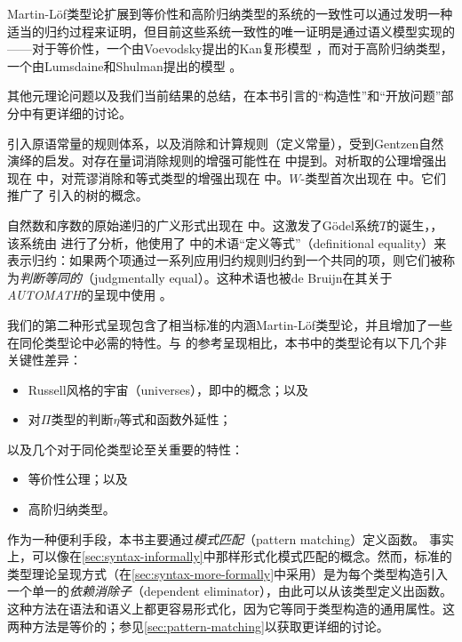 Martin-Löf类型论扩展到等价性和高阶归纳类型的系统的一致性可以通过发明一种适当的归约过程来证明，但目前这些系统一致性的唯一证明是通过语义模型实现的——对于等价性，一个由Voevodsky提出的Kan复形模型 \cite{klv:ssetmodel}，而对于高阶归纳类型，一个由Lumsdaine和Shulman提出的模型 \cite{ls:hits}。

其他元理论问题以及我们当前结果的总结，在本书引言的“构造性”和“开放问题”部分中有更详细的讨论。

%
\sectionNotes\label{subsec:general-remarks}


引入原语常量的规则体系，以及消除和计算规则（定义常量），受到Gentzen自然演绎的启发。对存在量词消除规则的增强可能性在 \cite{howard:pat} 中提到。对析取的公理增强出现在 \cite{Martin-Lof-1972} 中，对荒谬消除和等式类型的增强出现在 \cite{Martin-Lof-1973} 中。$W$-类型首次出现在 \cite{Martin-Lof-1979} 中。它们推广了 \cite{Tait-1968} 引入的树的概念。
%


自然数和序数的原始递归的广义形式出现在 \cite{Hilbert-1925} 中。这激发了G\"odel系统$T$的诞生，\cite{Goedel-T-1958}，该系统由 \cite{Tait-1966} 进行了分析，他使用了 \cite{Goedel-T-1958} 中的术语“定义等式”（definitional equality）来表示归约：如果两个项通过一系列应用归约规则归约到一个共同的项，则它们被称为\emph{判断等同的}（judgmentally equal）。这种术语也被de Bruijn在其关于\emph{AUTOMATH}的呈现中使用 \cite{deBruijn-1973}。
%

我们的第二种形式呈现包含了相当标准的内涵Martin-Löf类型论，并且增加了一些在同伦类型论中必需的特性。与 \cite{hofmann:syntax-and-semantics} 的参考呈现相比，本书中的类型论有以下几个非关键性差异：
%
\begin{itemize}
\item Russell风格的宇宙（universes），即\cite{martin-lof:bibliopolis}中的概念；以及
\item 对$\Pi$类型的判断$\eta$等式和函数外延性；
\end{itemize}
以及几个对于同伦类型论至关重要的特性：
\begin{itemize}
\item 等价性公理；以及
\item 高阶归纳类型。
\end{itemize}
%
作为一种便利手段，本书主要通过\emph{模式匹配}（pattern matching）定义函数。
%
%
事实上，可以像在\cref{sec:syntax-informally}中那样形式化模式匹配的概念。然而，标准的类型理论呈现方式（在\cref{sec:syntax-more-formally}中采用）是为每个类型构造引入一个单一的\emph{依赖消除子}（dependent eliminator），由此可以从该类型定义出函数。这种方法在语法和语义上都更容易形式化，因为它等同于类型构造的通用属性。这两种方法是等价的；参见\cref{sec:pattern-matching}以获取更详细的讨论。

%
%
